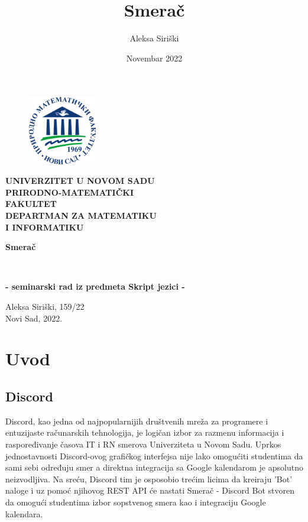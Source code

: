 \documentclass[a4paper,11pt]{article}
\title{Smerač}
\author{Aleksa Siriški}
\date{Novembar 2022}
\begin{document}
\pagestyle{empty}
\begin{center}
    \begin{figure}
        \centering
        \includegraphics[height=3cm,width=3cm]{pmf}
    \end{figure}

    \textbf{
    UNIVERZITET U NOVOM SADU
    \\
    PRIRODNO-MATEMATIČKI
    \\
    FAKULTET
    \\
    DEPARTMAN ZA MATEMATIKU
    \\
    I INFORMATIKU
    }

\end{center}
\vfill
\begin{center}
	\begin{huge}
		\textbf{Smerač}
		\bigskip 
	\end{huge}
	\\
	\begin{large}
        \textbf{- seminarski rad iz predmeta Skript jezici -}
	\end{large}
\end{center}
\vfill
\begin{center}
    Aleksa Siriški, 159/22
    \\
    Novi Sad, 2022.
\end{center}
\newpage

\pagestyle{plain}
\renewcommand{\contentsname}{Sadržaj}
\tableofcontents
\newpage

\pagestyle{fancy}
\fancyhf{}
\cfoot{\thepage}

\section{Uvod}
\subsection{Discord}
Discord\cite{discord}, kao jedna od najpopularnijih društvenih mreža za programere i entuzijaste računarskih tehnologija, je logičan izbor za razmenu informacija i raspoređivanje časova IT i RN smerova Univerziteta u Novom Sadu. Uprkos jednostavnosti Discord-ovog grafičkog interfejsa nije lako omogućiti studentima da sami sebi određuju smer a direktna integracija sa Google kalendarom je apsolutno neizvodljiva. Na sreću, Discord tim je osposobio trećim licima da kreiraju 'Bot' naloge i uz pomoć njihovog REST API će nastati Smerač - Discord Bot stvoren da omogući studentima izbor sopstvenog smera kao i integraciju Google kalendara.
\end{document}
